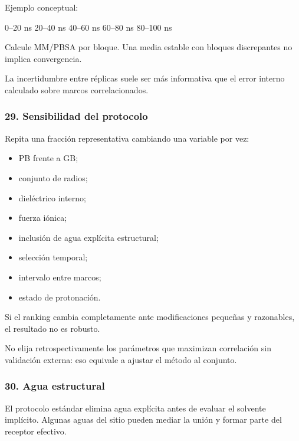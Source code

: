 \documentclass[
  spanish,
  11pt,
  a4paper]{article}
\newenvironment{Shaded}{\begin{snugshade}}{\end{snugshade}}
\newcommand{\NormalTok}[1]{#1}
\providecommand{\tightlist}{%
  \setlength{\itemsep}{0pt}\setlength{\parskip}{0pt}}
\begin{document}
Ejemplo conceptual:

\begin{Shaded}
\begin{Highlighting}[]
\NormalTok{0–20 ns}
\NormalTok{20–40 ns}
\NormalTok{40–60 ns}
\NormalTok{60–80 ns}
\NormalTok{80–100 ns}
\end{Highlighting}
\end{Shaded}

Calcule MM/PBSA por bloque. Una media estable con bloques discrepantes
no implica convergencia.

La incertidumbre entre réplicas suele ser más informativa que el error
interno calculado sobre marcos correlacionados.

\subsubsection{29. Sensibilidad del
protocolo}\label{sensibilidad-del-protocolo}

Repita una fracción representativa cambiando una variable por vez:

\begin{itemize}
\tightlist
\item
  PB frente a GB;
\item
  conjunto de radios;
\item
  dieléctrico interno;
\item
  fuerza iónica;
\item
  inclusión de agua explícita estructural;
\item
  selección temporal;
\item
  intervalo entre marcos;
\item
  estado de protonación.
\end{itemize}

Si el ranking cambia completamente ante modificaciones pequeñas y
razonables, el resultado no es robusto.

No elija retrospectivamente los parámetros que maximizan correlación sin
validación externa: eso equivale a ajustar el método al conjunto.

\subsubsection{30. Agua estructural}\label{agua-estructural}

El protocolo estándar elimina agua explícita antes de evaluar el
solvente implícito. Algunas aguas del sitio pueden mediar la unión y
formar parte del receptor efectivo.
\end{document}
